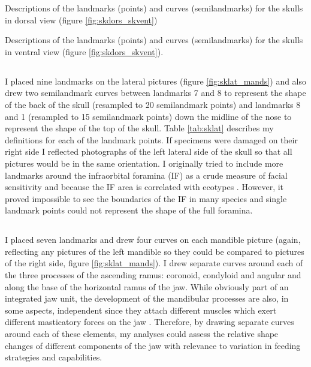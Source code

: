 
\begin{table}[h]
	\caption[Skulls: dorsal landmarks]
		{Descriptions of the landmarks (points) and curves (semilandmarks) for the skulls in dorsal view (figure
		\ref{fig:skdors_skvent})} 
	
	\label{tab:skdors}
\end{table}

\begin{table}[!htb] %
\caption[Skulls: ventral landmarks]
		{Descriptions of the landmarks (points) and curves (semilandmarks) for the skulls in ventral view (figure \ref{fig:skdors_skvent}).} 

\label{tab:skvent}
\end{table}
\newpage
\subsection{}
	I placed nine landmarks on the lateral pictures (figure \ref{fig:sklat_mands}) and also drew two semilandmark curves between landmarks 7 and 8 to represent the shape of the back of the skull (resampled to 20 semilandmark points) and landmarks 8 and 1 (resampled to 15 semilandmark points) down the midline of the nose to represent the shape of the top of the skull. Table \ref{tab:sklat} describes my definitions for each of the landmark points.
	If specimens were damaged on their right side I reflected photographs of the left lateral side of the skull so that all pictures would be in the same orientation.
	I originally tried to include more landmarks around the infraorbital foramina (IF) as a crude measure of facial sensitivity and because the IF area is correlated with ecotypes \citep{Crumpton2012}. However, it proved impossible to see the boundaries of the IF in many species and single landmark points could not represent the shape of the full foramina. 

\subsection{}
	I placed seven landmarks and drew four curves on each mandible picture (again, reflecting any pictures of the left mandible so they could be compared to pictures of the right side, figure \ref{fig:sklat_mands}). I drew separate curves around each of the three processes of the ascending ramus: coronoid, condyloid and angular and along the base of the horizontal ramus of the jaw. While obviously part of an integrated jaw unit, the development of the mandibular processes are also, in some aspects, independent since they attach different muscles which exert different masticatory forces on the jaw \citep{Barrow2008}. Therefore, by drawing separate curves around each of these elements, my analyses could assess the relative shape changes of different components of the jaw with relevance to variation in feeding strategies and capabilities.

